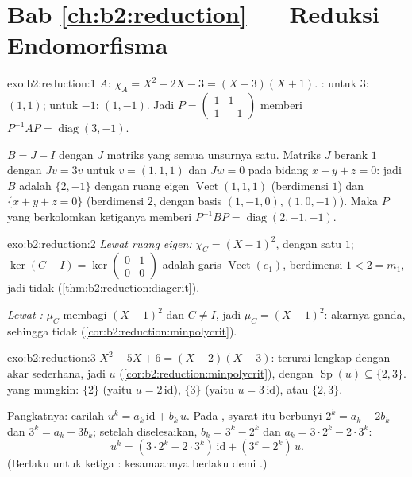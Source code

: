\section*{Bab \ref{ch:b2:reduction} --- Reduksi Endomorfisma}

\begin{solution}{exo:b2:reduction:1}
$A$: $\chi_A = X^2 - 2X - 3 = (X - 3)(X + 1)$. : untuk
$3$: $(1,1)$; untuk $-1$: $(1,-1)$. Jadi $P = \begin{pmatrix} 1 & 1\\ 1
& -1\end{pmatrix}$ memberi $P^{-1}AP = \operatorname{diag}(3, -1)$.

$B = J - I$ dengan $J$ matriks yang semua unsurnya satu. Matriks $J$
berank $1$ dengan $Jv = 3v$ untuk $v = (1,1,1)$ dan $Jw = 0$ pada bidang
$x + y + z = 0$: jadi  $B$ adalah $\{2, -1\}$ dengan ruang eigen
$\operatorname{Vect}(1,1,1)$ (berdimensi $1$) dan $\{x + y + z = 0\}$
(berdimensi $2$, dengan basis $(1,-1,0), (1,0,-1)$). Maka $P$ yang
berkolomkan ketiganya memberi $P^{-1}BP = \operatorname{diag}(2, -1, -1)$.
\end{solution}

\begin{solution}{exo:b2:reduction:2}
\emph{Lewat ruang eigen:} $\chi_C = (X-1)^2$, dengan satu  $1$;
$\ker(C - I) = \ker\begin{pmatrix} 0&1\\ 0&0\end{pmatrix}$ adalah
garis $\operatorname{Vect}(e_1)$, berdimensi $1 < 2 = m_1$, jadi tidak
 (\cref{thm:b2:reduction:diagcrit}).

\emph{Lewat :} $\mu_C$ membagi $(X-1)^2$ dan $C \neq I$,
jadi $\mu_C = (X-1)^2$: akarnya ganda, sehingga tidak 
(\cref{cor:b2:reduction:minpolycrit}).
\end{solution}

\begin{solution}{exo:b2:reduction:3}
$X^2 - 5X + 6 = (X-2)(X-3)$: terurai lengkap dengan akar sederhana, jadi
$u$  (\cref{cor:b2:reduction:minpolycrit}), dengan
$\operatorname{Sp}(u) \subseteq \{2, 3\}$.  yang mungkin:
$\{2\}$ (yaitu $u = 2\,\mathrm{id}$), $\{3\}$ (yaitu $u = 3\,\mathrm{id}$),
atau $\{2, 3\}$.

Pangkatnya: carilah $u^k = a_k\,\mathrm{id} + b_k\,u$. Pada ,
syarat itu berbunyi $2^k = a_k + 2b_k$ dan $3^k = a_k + 3b_k$; setelah
diselesaikan, $b_k = 3^k - 2^k$ dan $a_k = 3\cdot2^k - 2\cdot 3^k$:
\[
u^k = (3\cdot 2^k - 2\cdot 3^k)\,\mathrm{id} + (3^k - 2^k)\, u .
\]
(Berlaku untuk ketiga : kesamaannya berlaku  demi .)
\end{solution}

